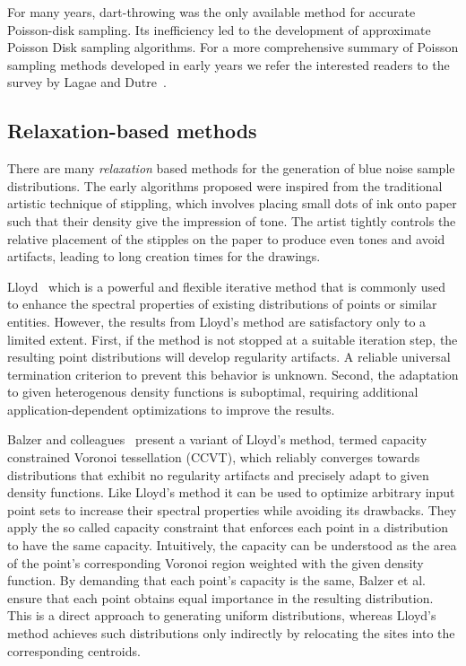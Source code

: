 For many years, dart-throwing was the only available method for
accurate Poisson-disk sampling. Its inefficiency led to the development
of approximate Poisson Disk sampling algorithms. For a more comprehensive summary of Poisson 
sampling methods developed in early years 
we refer the interested readers to the survey by Lagae and Dutre~\cite{journals/cgf/LagaeD08}.

\subsection{Relaxation-based methods}

There are many \emph{relaxation} based methods for the generation of blue noise sample 
distributions. The early algorithms proposed were inspired from the traditional artistic technique of 
stippling, which involves placing small dots of ink onto paper such that their density give the 
impression of tone. The artist tightly controls the relative placement of the stipples on the paper to 
produce even tones and avoid artifacts, leading to long creation times for the drawings. 

Lloyd~\cite{Lloyd.82} 
which is a powerful and flexible iterative method that is commonly used to enhance the spectral properties of existing distributions of points or similar entities. However, the results from Lloyd’s method are satisfactory only to a limited 
extent. First, if the method is not stopped at a suitable iteration step, the resulting point distributions will develop regularity 
artifacts. A reliable universal termination criterion to prevent this behavior is unknown. Second, the adaptation to given 
heterogenous density functions is suboptimal, requiring additional application-dependent optimizations to improve the 
results.

Balzer and colleagues~\cite{Balzer:2009:CPD:1531326.1531392} present a variant of Lloyd’s method, termed capacity constrained Voronoi 
tessellation (CCVT), which reliably converges towards distributions that exhibit no regularity artifacts and precisely adapt 
to given density functions. Like Lloyd’s 
method it can be used to optimize arbitrary input point sets to increase their spectral properties while avoiding its 
drawbacks. They apply the so called capacity constraint that enforces each point in a distribution to have the same 
capacity. Intuitively, the capacity can be understood as the area of the point’s corresponding Voronoi region weighted with 
the given density function. By demanding that each point’s capacity is the same, Balzer et al. ensure that each point 
obtains equal importance in the resulting distribution. This is a direct approach to generating uniform 
distributions, whereas Lloyd’s method achieves such distributions only indirectly by relocating the sites into the 
corresponding centroids.


